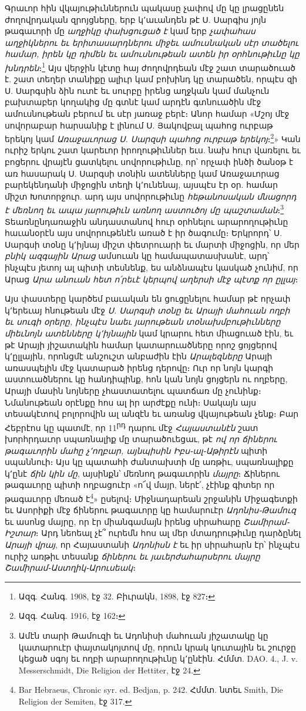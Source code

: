 \documentclass{article}
\begin{document}
{Գրաւոր հին վկայութիւններուն պակասը չափով մը կը լրացընեն ժողովրդական զրոյցները, երբ կ՚աւանդեն թէ Ս. Սարգիս յոյն թագաւորի մը \emph{աղջիկը փախցուցած է} կամ երբ \emph{չափահաս աղջիկներու եւ երիտասարդներու միջեւ ամուսնական սէր տածելու համար, իրեն կը դիմեն եւ ամուսնութեան ատեն իր օրհնութիւնը կը խնդրեն}։\footnote{Ազգ. Հանգ. 1908, էջ 32. Բիւրակն, 1898, էջ 827։} Այս վերջին կէտը հայ ժողովրդեան մէջ շատ տարածուած է. շատ տեղեր տանիքը ալիւր կամ բոխինդ կը տարածեն, որպէս զի Ս. Սարգսին ձին ուտէ եւ սուրբը իրենց աղջկան կամ մանչուն բախտաբեր կողակից մը գտնէ կամ արդէն գտնուածին մէջ ամուսնութեան բերում եւ սէր յառաջ բերէ։ Անոր համար «Մշոյ մէջ սովորաբար հարսանիք է լինում Ս. Յակովբալ պահոց ուրբաթ երեկոյ կամ \emph{Առաջաւորաց Ս. Սարզսի պահոց ուրբաթ երեկոյ}։\footnote{Ազգ. Հանգ. 1916, էջ 162։}» Կան ուրիշ երկու շատ կարեւոր իրողութիւններ եւս. նախ հուր վառելու եւ բոցերու վրայէն ցատկելու սովորութիւնը, որ՝ որչափ ինծի ծանօթ է առ հասարակ Ս. Սարգսի տօնին ատենները կամ Առաջաւորաց բարեկենդանի միջոցին տեղի կ՚ունենայ, այսպէս էր օր. համար միշտ Խոտորջուր. արդ այս սովորութիւնը \emph{հեթանոսական մնացորդ է մեռնող եւ ապա յարութիւն առնող աստուծոյ մը պաշտաման}։\footnote{Ամէն տարի Թամուզի եւ Ադոնիսի մահուան յիշատակը կը կատարուէր փայտակոյտով մը, որուն կրակ կուտային եւ շուրջը կեցած սգոյ եւ ողբի արարողութիւնը կ՚ընէին. Հմմտ. DAO. 4., J. v. Messerschmidt, Die Religion der Hettiter, էջ 24.} Տեառնընդառաջին անդաստանով հուր օրհնելու արարողութիւնը հաւանօրէն այս սովորութենէն առած է իր ծագումը։ Երկրորդ՝ Ս. Սարգսի տօնը կ՚իյնայ միշտ փետրուարի եւ մարտի միջոցին, որ մեր \emph{բնիկ ազգային Արաց} ամսուան կը համապատասխանէ, արդ՝ ինչպէս յետոյ ալ պիտի տեսնենք, ես անձնապէս կասկած չունիմ, որ Արաց \emph{Արա անուան հետ ո՛րեւէ կերպով աղերսի մէջ պէտք որ ըլլայ}։

Այս փաստերը կարծեմ բաւական են ցուցընելու համար թէ որչափ կ՚երեւայ հնութեան մէջ \emph{Ս. Սարգսի տօնը եւ Արայի մահուան ողբի եւ սուգի օրերը, ինչպէս նաեւ յարութեան տօնախմբութիւնները միեւնոյն ատենները կ՚իյնային} կամ կրարու հետ միացուած էին, եւ թէ Արայի յիշատակին համար կատարուածները որոշ ցոյցերով կ՚ըլլային, որոնցմէ անշուշտ անբաժին էին \emph{Արալեզները} Արայի առասպելին մէջ կատարած իրենց դերովը։ Ուր որ նոյն կարգի աստուածներու կը հանդիպինք, հոն կան նոյն ցոյցերն ու ողբերը, Արայի մասին նոյները չհաստատելու պատճառ մը չունինք։ Նմանութեան օրէնքը հոս ալ իր արժէքը ունի։ Սակայն այս տեսակէտով բոլորովին ալ անզէն եւ առանց վկայութեան չենք։ Բար Հեբրէոս կը պատմէ, որ 11\textsuperscript{րդ} դարու մէջ \emph{Հայաստանէն} շատ խորհրդաւոր սպառնալիք մը տարածուեցաւ, թէ \emph{ով որ ճիներու թագաւորին մահը չ՚ողբար, այնպիսին Իբս֊ալ֊Աթիրէն} պիտի սպաննուի։ Այս կը պատահի ժանտախտի մը առթիւ, սպառնալիքը կ՚ընէ \emph{ճին կին մը}, այսինքն՝ մեռնող թագաւորին \emph{մայրը}։ Ճիներու թագաւորը պիտի ողբացուէր «ո՜վ մայր, ներէ՛, չէինք գիտեր որ թագաւորը մեռած է\footnote{Bar Hebraeus, Chronic syr. ed. Bedjan, p. 242. Հմմտ. նտեւ Smith, Die Religion der Semiten, էջ 317.}» ըսելով։ Միջնադարեան շրջանին Միջագետքի եւ Ասորիքի մէջ ճիներու թագաւորը կը համարուէր \emph{Ադոնիս֊Թամուզ} եւ ասոնց մայրը, որ էր միանգամայն իրենց սիրահարը \emph{Շամիրամ֊Իշտար}։ Արդ նեոեալ չէ՞ ուրեմն հոս ալ մեր մտադրութիւնը դարձընել \emph{Արայի վրայ}, որ Հայաստանի \emph{Ադոնիսն է} եւ իր սիրահարն էր՝ ինչպէս ուրիշ առթիւ տեսանք \emph{ճիներու եւ յաւերժահարսերու մայրը Շամիրամ֊Աստղիկ֊Արուսեակ}։

}
\end{document}
